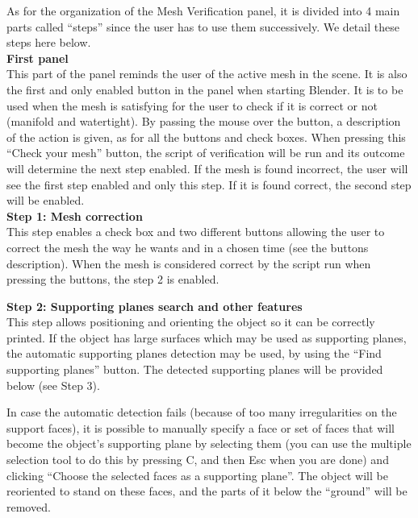 \documentclass{article}
\begin{document}
As for the organization of the Mesh Verification panel, it is divided into 4 main parts called ``steps'' since the user has to use them successively. We detail these steps here below.\\

\textbf{First panel} \\

This part of the panel reminds the user of the active mesh in the scene. It is also the first and only enabled button in the panel when starting Blender. It is to be used when the mesh is satisfying for the user to check if it is correct or not (manifold and watertight). By passing the mouse over the button, a description of the action is given, as for all the buttons and check boxes. When pressing this ``Check your mesh'' button, the script of verification will be run and its outcome will determine the next step enabled. If the mesh is found incorrect, the user will see the first step enabled and only this step. If it is found correct, the second step will be enabled.\\

\textbf{Step 1: Mesh correction} \\

This step enables a check box and two different buttons allowing the user to correct the mesh the way he wants and in a chosen time (see the buttons description). When the mesh is considered correct by the script run when pressing the buttons, the step 2 is enabled. 

\textbf{Step 2: Supporting planes search and other features}\\

This step allows positioning and orienting the object so it can be correctly printed.
If the object has large surfaces which may be used as supporting planes, the automatic supporting planes detection may be used, by using the ``Find supporting planes'' button. The detected supporting planes will be provided below (see Step 3).

In case the automatic detection fails (because of too many irregularities on the support faces), it is possible to manually specify a face or set of faces that will become the object’s supporting plane by selecting them (you can use the multiple selection tool to do this by pressing C, and then Esc when you are done) and clicking ``Choose the selected faces as a supporting plane''. The object will be reoriented to stand on these faces, and the parts of it below the ``ground'' will be removed.
\end{document}
